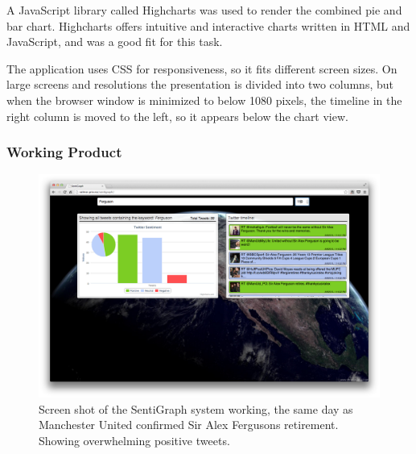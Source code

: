 A JavaScript library called Highcharts was used to render the combined pie and bar chart. Highcharts offers intuitive and interactive charts written in HTML and JavaScript, and was a good fit for this task. 

The application uses CSS for responsiveness, so it fits different screen sizes. On large screens and resolutions the presentation is divided into two columns, but when the browser window is minimized to below 1080 pixels, the timeline in the right column is moved to the left, so it appears below the chart view.

\subsubsection{Working Product}

\begin{figure}[htb!]
\begin{center}
 \includegraphics[width=\textwidth]{../img/screenshot_sentigraph.png}
 \caption[SentiGraph screen shot]{Screen shot of the SentiGraph system working, the same day as Manchester United confirmed Sir Alex Fergusons retirement. Showing overwhelming positive tweets.}
 \label{fig:sentigraph_screenshot}
\end{center}
\end{figure}

